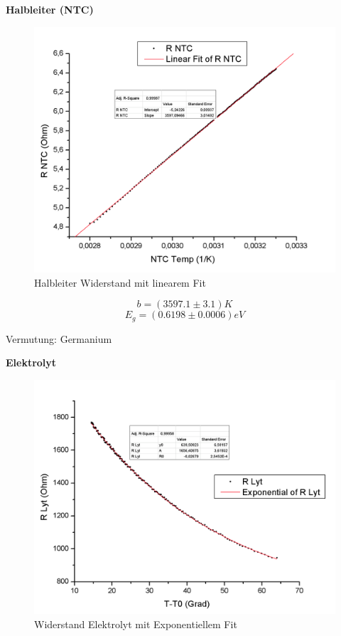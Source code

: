 \documentclass[12pt,a4paper]{article}
\begin{document}
\pagebreak



\noindent \textbf{Halbleiter (NTC)}


\begin{figure}[H]
	\centering
	\includegraphics[scale=0.70]{./figure/RNTC_NTC_temp.png}
	\caption{Halbleiter Widerstand mit linearem Fit}
	\label{fig:rntc}
\end{figure}


 $$b = (3597.1 \pm  3.1   )K$$
$$E_g = (0.6198 \pm 0.0006   )eV$$

Vermutung: Germanium

\pagebreak


\noindent \textbf{Elektrolyt}


\begin{figure}[H]
	\centering
	\includegraphics[scale=0.60]{./figure/Rlyt_t_t0.png}
	\caption{Widerstand Elektrolyt mit Exponentiellem Fit}
	\label{fig:rlyt}
\end{figure}
\end{document}
